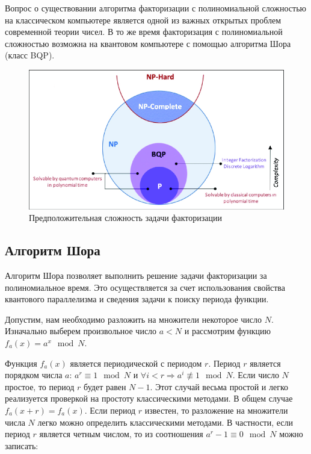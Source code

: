 \documentclass[12pt]{article}
\begin{document}
Вопрос о существовании алгоритма факторизации с полиномиальной сложностью на классическом компьютере является одной из важных открытых проблем современной теории чисел. В то же время факторизация с полиномиальной сложностью возможна на квантовом компьютере с помощью алгоритма Шора (класс BQP).

\begin{figure}[h]
    \centering
    \includegraphics[width=\textwidth]{res/problems-complexity.png}
    \caption{Предположительная сложность задачи факторизации}
    \label{fig:compl}
\end{figure}

\newpage

\subsection{Алгоритм Шора}

Алгоритм Шора позволяет выполнить решение задачи факторизации за полиномиальное время. Это осуществляется за счет использования свойства квантового параллелизма и сведения задачи к поиску периода функции.

Допустим, нам необходимо разложить на множители некоторое число \( N \). Изначально выберем произвольное число \( a < N \) и рассмотрим функцию \( f_a(x) = a^x \mod N \).

Функция \( f_a(x) \) является периодической с периодом \( r \). Период \( r \) является порядком числа \( a \): \( a^r \equiv 1 \mod N \) и \( \forall i < r \Rightarrow a^i \not\equiv 1 \mod N \). Если число \( N \) простое, то период \( r \) будет равен \( N - 1 \). Этот случай весьма простой и легко реализуется проверкой на простоту классическими методами. В общем случае \( f_a(x + r) = f_a(x) \). Если период \( r \) известен, то разложение на множители числа \( N \) легко можно определить классическими методами. В частности, если период \( r \) является четным числом, то из соотношения \( a^r - 1 \equiv 0 \mod N \) можно записать:
\end{document}
